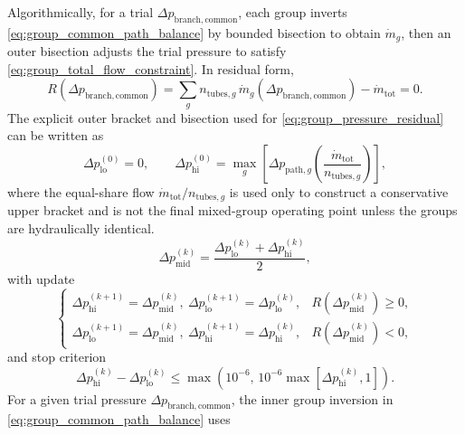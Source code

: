 \documentclass[11pt]{article}
\begin{document}
Algorithmically, for a trial \(\Delta p_{\mathrm{branch,common}}\), each group inverts \eqref{eq:group_common_path_balance} by bounded bisection to obtain \(\dot m_g\), then an outer bisection adjusts the trial pressure to satisfy \eqref{eq:group_total_flow_constraint}. In residual form,
\begin{equation}
\label{eq:group_pressure_residual}
R\!\left(\Delta p_{\mathrm{branch,common}}\right)=
\sum_g n_{\mathrm{tubes},g}\,\dot m_g\!\left(\Delta p_{\mathrm{branch,common}}\right)-\dot m_{\mathrm{tot}}=0.
\end{equation}
The explicit outer bracket and bisection used for \eqref{eq:group_pressure_residual} can be written as
\begin{equation}
\label{eq:group_outer_bracket_init}
\Delta p_{\mathrm{lo}}^{(0)}=0,
\qquad
\Delta p_{\mathrm{hi}}^{(0)}=
\max_g\!\left[
\Delta p_{\mathrm{path},g}\!\left(\frac{\dot m_{\mathrm{tot}}}{n_{\mathrm{tubes},g}}\right)
\right],
\end{equation}
where the equal-share flow \(\dot m_{\mathrm{tot}}/n_{\mathrm{tubes},g}\) is used only to construct a conservative upper bracket and is not the final mixed-group operating point unless the groups are hydraulically identical.
\begin{equation}
\label{eq:group_outer_midpoint}
\Delta p_{\mathrm{mid}}^{(k)}=\frac{\Delta p_{\mathrm{lo}}^{(k)}+\Delta p_{\mathrm{hi}}^{(k)}}{2},
\end{equation}
with update
\begin{equation}
\label{eq:group_outer_update}
\begin{cases}
\Delta p_{\mathrm{hi}}^{(k+1)}=\Delta p_{\mathrm{mid}}^{(k)},\ \Delta p_{\mathrm{lo}}^{(k+1)}=\Delta p_{\mathrm{lo}}^{(k)}, & R\!\left(\Delta p_{\mathrm{mid}}^{(k)}\right)\ge 0,\\
\Delta p_{\mathrm{lo}}^{(k+1)}=\Delta p_{\mathrm{mid}}^{(k)},\ \Delta p_{\mathrm{hi}}^{(k+1)}=\Delta p_{\mathrm{hi}}^{(k)}, & R\!\left(\Delta p_{\mathrm{mid}}^{(k)}\right)<0,
\end{cases}
\end{equation}
and stop criterion
\begin{equation}
\label{eq:group_outer_stop}
\Delta p_{\mathrm{hi}}^{(k)}-\Delta p_{\mathrm{lo}}^{(k)}
\le
\max\!\left(10^{-6},\,10^{-6}\max\!\left[\Delta p_{\mathrm{hi}}^{(k)},1\right]\right).
\end{equation}
For a given trial pressure \(\Delta p_{\mathrm{branch,common}}\), the inner group inversion in \eqref{eq:group_common_path_balance} uses
\end{document}
